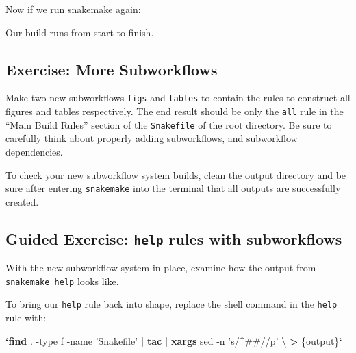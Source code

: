 \documentclass[]{book}
\newenvironment{Shaded}{\begin{snugshade}}{\end{snugshade}}
\newcommand{\KeywordTok}[1]{\textcolor[rgb]{0.13,0.29,0.53}{\textbf{{#1}}}}
\newcommand{\DataTypeTok}[1]{\textcolor[rgb]{0.13,0.29,0.53}{{#1}}}
\newcommand{\StringTok}[1]{\textcolor[rgb]{0.31,0.60,0.02}{{#1}}}
\newcommand{\NormalTok}[1]{{#1}}
\theoremstyle{definition}
\theoremstyle{definition}
\theoremstyle{definition}
\theoremstyle{remark}
\begin{document}
Now if we run snakemake again:

\begin{Shaded}
\end{Shaded}

Our build runs from start to finish.

\subsection*{Exercise: More
Subworkflows}\label{exercise-more-subworkflows}

Make two new subworkflows \texttt{figs} and \texttt{tables} to contain
the rules to construct all figures and tables respectively. The end
result should be only the \texttt{all} rule in the ``Main Build Rules''
section of the \texttt{Snakefile} of the root directory. Be sure to
carefully think about properly adding subworkflows, and subworkflow
dependencies.

To check your new subworkflow system builds, clean the output directory
and be sure after entering \texttt{snakemake} into the terminal that all
outputs are successfully created.

\subsection*{\texorpdfstring{Guided Exercise: \texttt{help} rules with
subworkflows}{Guided Exercise: help rules with subworkflows}}\label{guided-exercise-help-rules-with-subworkflows}

With the new subworkflow system in place, examine how the output from
\texttt{snakemake\ help} looks like.

To bring our \texttt{help} rule back into shape, replace the shell
command in the \texttt{help} rule with:

\begin{Shaded}
\begin{Highlighting}[]
\KeywordTok{`find} \NormalTok{. -type f -name }\StringTok{'Snakefile'} \KeywordTok{|} \KeywordTok{tac} \KeywordTok{|} \KeywordTok{xargs} \NormalTok{sed -n }\StringTok{'s/^##//p'} \NormalTok{\textbackslash{}}
            \KeywordTok{>} \DataTypeTok{\{output\}}\KeywordTok{`}
\end{Highlighting}
\end{Shaded}
\end{document}
